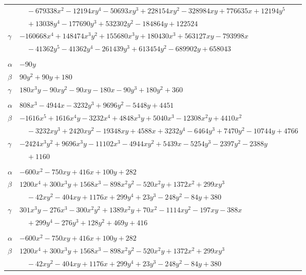 \documentclass[11pt]{article}
\begin{document}
\begin{longtable}{@{}ll@{}}
 & $\quad -679338x^{2}-12194xy^{4}-50693xy^{3}+228154xy^{2}-328984xy+776635x+12194y^{5}$\\
 & $\quad +13038y^{4}-177690y^{3}+532302y^{2}-184864y+122524$\\
$\gamma$ & $-160668x^{4}+148474x^{3}y^{2}+155680x^{3}y+180430x^{3}+563127xy-793998x$\\
 & $\quad -41362y^{5}-41362y^{4}-261439y^{3}+613454y^{2}-689902y+658043$\\
\addlinespace[3pt]
\multicolumn{2}{@{}l}{$\{i,j\}=\{10,49\}$, $k_{ij}=2^{2}\cdot 3^{2}\cdot 5$}\\
$\alpha$ & $-90y$\\
$\beta$ & $90y^{2}+90y+180$\\
$\gamma$ & $180x^{3}y-90xy^{2}-90xy-180x-90y^{3}+180y^{2}+360$\\
\addlinespace[3pt]
\multicolumn{2}{@{}l}{$\{i,j\}=\{10,68\}$, $k_{ij}=3^{2}\cdot 5\cdot 7$}\\
$\alpha$ & $808x^{3}-4944x-3232y^{3}+9696y^{2}-5448y+4451$\\
$\beta$ & $-1616x^{5}+1616x^{4}y-3232x^{4}+4848x^{3}y+5040x^{3}-12308x^{2}y+4410x^{2}$\\
 & $\quad -3232xy^{3}+2420xy^{2}-19348xy+4588x+3232y^{4}-6464y^{3}+7470y^{2}-10744y+4766$\\
$\gamma$ & $-2424x^{3}y^{2}+9696x^{3}y-11102x^{3}-4944xy^{2}+5439x-5254y^{3}-2397y^{2}-2388y$\\
 & $\quad +1160$\\
\addlinespace[3pt]
\multicolumn{2}{@{}l}{$\{i,j\}=\{10,69\}$, $k_{ij}=2\cdot 7^{2}$}\\
$\alpha$ & $-600x^{2}-750xy+416x+100y+282$\\
$\beta$ & $1200x^{4}+300x^{3}y+1568x^{3}-898x^{2}y^{2}-520x^{2}y+1372x^{2}+299xy^{3}$\\
 & $\quad -42xy^{2}-404xy+1176x+299y^{4}+23y^{3}-248y^{2}-84y+380$\\
$\gamma$ & $301x^{3}y-276x^{3}-300x^{2}y^{2}+1389x^{2}y+70x^{2}-1114xy^{2}-197xy-388x$\\
 & $\quad +299y^{4}-276y^{3}+128y^{2}+469y+416$\\
\addlinespace[3pt]
\multicolumn{2}{@{}l}{$\{i,j\}=\{10,79\}$, $k_{ij}=2\cdot 7^{2}$}\\
$\alpha$ & $-600x^{2}-750xy+416x+100y+282$\\
$\beta$ & $1200x^{4}+300x^{3}y+1568x^{3}-898x^{2}y^{2}-520x^{2}y+1372x^{2}+299xy^{3}$\\
 & $\quad -42xy^{2}-404xy+1176x+299y^{4}+23y^{3}-248y^{2}-84y+380$\\

\end{longtable}
\end{document}
